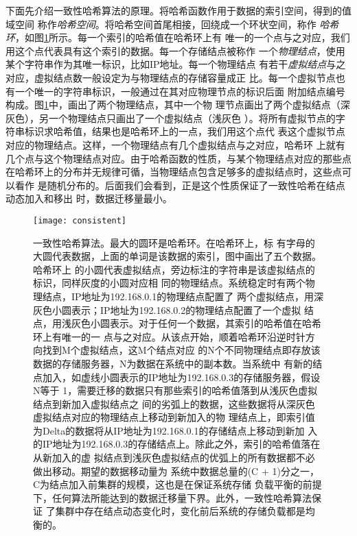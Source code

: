 下面先介绍一致性哈希算法的原理。将哈希函数作用于数据的索引空间，得到的值域空间
称作\emph{哈希空间}。将哈希空间首尾相接，回绕成一个环状空间，称作
\emph{哈希环}，如图\ref{figure:consistent}所示。每一个索引的哈希值在哈希环上有
唯一的一个点与之对应，我们用这个点代表具有这个索引的数据。每一个存储结点被称作
一个\emph{物理结点}，使用某个字符串作为其唯一标识，比如IP地址。每一个物理结点
有若干\emph{虚拟结点}与之对应，虚拟结点数一般设定为与物理结点的存储容量成正
比。每一个虚拟节点也有一个唯一的字符串标识，一般通过在其对应物理节点的标识后面
附加结点编号构成。图\ref{figure:consistent}中，画出了两个物理结点，其中一个物
理节点画出了两个虚拟结点（深灰色），另一个物理结点只画出了一个虚拟结点（浅灰色
）。将所有虚拟节点的字符串标识求哈希值，结果也是哈希环上的一点，我们用这个点代
表这个虚拟节点对应的物理结点。这样，一个物理结点有几个虚拟结点与之对应，哈希环
上就有几个点与这个物理结点对应。由于哈希函数的性质，与某个物理结点对应的那些点
在哈希环上的分布并无规律可循，当物理结点包含足够多的虚拟结点时，这些点可以看作
是随机分布的。后面我们会看到，正是这个性质保证了一致性哈希在结点动态加入和移出
时，数据迁移量最小。
\begin{figure}
  \centering
  \texttt{[image: consistent]}
  \caption[一致性哈希算法]{一致性哈希算法。最大的圆环是哈希环。在哈希环上，标
  有字母的大圆代表数据，上面的单词是该数据的索引，图中画出了五个数据。哈希环上
  的小圆代表虚拟结点，旁边标注的字符串是该虚拟结点的标识，同样灰度的小圆对应相
  同的物理结点。系统稳定时有两个物理结点，IP地址为192.168.0.1的物理结点配置了
  两个虚拟结点，用深灰色小圆表示；IP地址为192.168.0.2的物理结点配置了一个虚拟
  结点，用浅灰色小圆表示。对于任何一个数据，其索引的哈希值在哈希环上有唯一的一
  点与之对应。从该点开始，顺着哈希环沿逆时针方向找到M个虚拟结点，这M个结点对应
  的N个不同物理结点即存放该数据的存储服务器，N为数据在系统中的副本数。当系统中
  有新的结点加入，如虚线小圆表示的IP地址为192.168.0.3的存储服务器，假设N等于
  1，需要迁移的数据只有那些索引的哈希值落到从浅灰色虚拟结点到新加入虚拟结点之
  间的劣弧上的数据，这些数据将从深灰色虚拟结点对应的物理结点上移动到新加入的物
  理结点上，即索引值为Delta的数据将从IP地址为192.168.0.1的存储结点上移动到新加
  入的IP地址为192.168.0.3的存储结点上。除此之外，索引的哈希值落在从新加入的虚
  拟结点到浅灰色虚拟结点的优弧上的所有数据都不必做出移动。期望的数据移动量为
  系统中数据总量的(C + 1)分之一，C为结点加入前集群的规模，这也是在保证系统存储
  负载平衡的前提下，任何算法所能达到的数据迁移量下界。此外，一致性哈希算法保证
  了集群中存在结点动态变化时，变化前后系统的存储负载都是均衡的。}
  \label{figure:consistent}
\end{figure}

